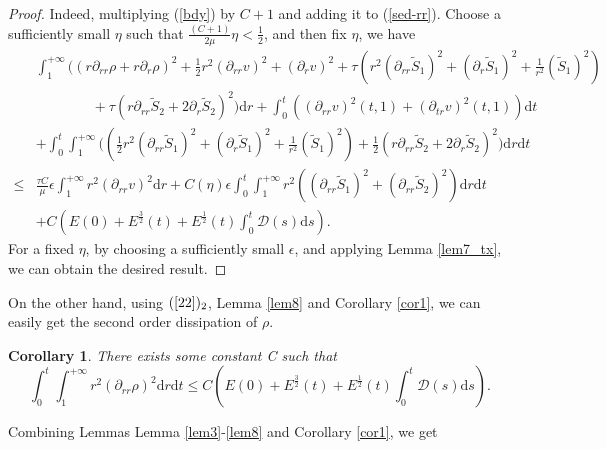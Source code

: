 \documentclass[10pt,reqno]{amsart}
\numberwithin{equation}{section}
\newtheorem{corollary}[theorem]{Corollary}
\begin{document}
	\begin{proof}
		Indeed, multiplying  (\ref{bdy}) by $C+1$ and adding it to (\ref{sed-rr}).
		Choose a sufficiently small $\eta$ such that $\frac{(C+1)}{2\mu}\eta<\frac{1}{2}$,
		and then fix $\eta$, we have 
		\begin{equation}
			\begin{aligned}
				&\int_{1}^{+\infty}\bigg(\left(r\partial_{rr} \rho+r\partial_{r} \rho\right)^2
				+\frac{1}{2}r^2 (\partial_{rr}v)^2+(\partial_{r}v)^2
				+\tau\left(r^2(\partial_{rr}\tilde{S}_1)^2+(\partial_{r}\tilde{S}_1)^2+\frac{1}{ r^2}(\tilde{S}_1)^2\right)\\
				&\qquad\qquad
				+\tau\left(r\partial_{rr} \tilde{S}_2+2\partial_{r} \tilde{S}_2\right)^2\bigg)\mathrm{d}r
				+\int_{0}^{t}\left((\partial_{rr}v)^2(t,1)+(\partial_{tr}v)^2(t,1)
				\right)\mathrm{d}t\\
				&+\int_0^t\int_{1}^{+\infty}\bigg((\frac{1}{2}r^2(\partial_{rr}\tilde{S}_1)^2+(\partial_{r}\tilde{S}_1)^2+\frac{1}{ r^2}(\tilde{S}_1)^2)
				+\frac{1}{2}\left(r\partial_{rr} \tilde{S}_2+2\partial_{r} \tilde{S}_2\right)^2\bigg)\mathrm{d}r\mathrm{d}t\\
				\leq &
				\frac{\tau C}{\mu}\epsilon\int_{1}^{+\infty}r^2(\partial_{rr}v)^2\mathrm{d}r
				+C(\eta)\epsilon\int_{0}^{t}\int_{1}^{+\infty}r^2((\partial_{rr}\tilde{S}_1)^2+(\partial_{rr}\tilde{S}_2)^2)\mathrm{d}r\mathrm{d}t\\
				&+C \left(E(0)+E^{\frac{3}{2}}(t)+E^{\frac{1}{2}}(t) \int_{0}^{t}\mathcal{D}(s)\mathrm{d}s\right).	
			\end{aligned}
		\end{equation}
		For a fixed $\eta$, by choosing a sufficiently small $\epsilon$, and applying Lemma \ref{lem7_tx}, we can obtain the desired result.
	\end{proof}
	On the other hand, using $(\ref{22})_2$, Lemma \ref{lem8} and Corollary \ref{cor1}, we can easily get the second order
	dissipation of $\rho$.
	\begin{corollary}
		There exists some constant C such that
		\begin{equation}
			\int_{0}^{t}\int_{1}^{+\infty}r^2(\partial_{rr}\rho)^2\mathrm{d}r\mathrm{d}t
			\leq C \left(E(0)+E^{\frac{3}{2}}(t)+E^{\frac{1}{2}}(t) \int_{0}^{t}\mathcal{D}(s)\mathrm{d}s\right).
		\end{equation}
	\end{corollary}
	Combining Lemmas Lemma \ref{lem3}-\ref{lem8} and Corollary \ref{cor1},  we get
\end{document}
